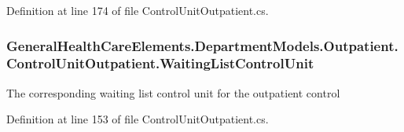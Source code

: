 Definition at line 174 of file Control\+Unit\+Outpatient.\+cs.

\subsubsection[{\texorpdfstring{Waiting\+List\+Control\+Unit}{WaitingListControlUnit}}]{ General\+Health\+Care\+Elements.\+Department\+Models.\+Outpatient.\+Control\+Unit\+Outpatient.\+Waiting\+List\+Control\+Unit\hspace{0.3cm}{\ttfamily [get]}}\hypertarget{class_general_health_care_elements_1_1_department_models_1_1_outpatient_1_1_control_unit_outpatient_a5d8ab87d8e946d9828a25b1c51908d5b}{}\label{class_general_health_care_elements_1_1_department_models_1_1_outpatient_1_1_control_unit_outpatient_a5d8ab87d8e946d9828a25b1c51908d5b}


The corresponding waiting list control unit for the outpatient control 



Definition at line 153 of file Control\+Unit\+Outpatient.\+cs.

